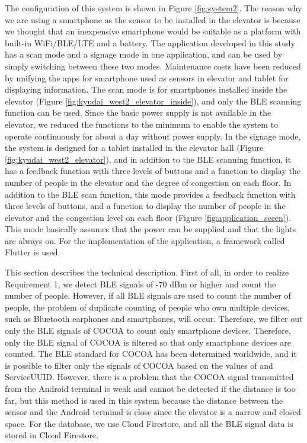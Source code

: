 The configuration of this system is shown in Figure \ref{fig:system2}. The reason why we are using a smartphone as the sensor to be installed in the elevator is because we thought that an inexpensive smartphone would be suitable as a platform with built-in WiFi/BLE/LTE and a battery. The application developed in this study has a scan mode and a signage mode in one application, and can be used by simply switching between these two modes. Maintenance costs have been reduced by unifying the apps for smartphone used as sensors in elevator and tablet for displaying information. The scan mode is for smartphones installed inside the elevator (Figure \ref{fig:kyudai_west2_elevator_inside}), and only the BLE scanning function can be used. Since the basic power supply is not available in the elevator, we reduced the functions to the minimum to enable the system to operate continuously for about a day without power supply. In the signage mode, the system is designed for a tablet installed in the elevator hall (Figure \ref{fig:kyudai_west2_elevator}), and in addition to the BLE scanning function, it has a feedback function with three levels of buttons and a function to display the number of people in the elevator and the degree of congestion on each floor. In addition to the BLE scan function, this mode provides a feedback function with three levels of buttons, and a function to display the number of people in the elevator and the congestion level on each floor (Figure \ref{fig:application_sceen}). This mode basically assumes that the power can be supplied and that the lights are always on. For the implementation of the application, a framework called Flutter is used.

\thispagestyle{kisuu}

This section describes the technical description. First of all, in order to realize Requirement 1, we detect BLE signals of -70 dBm or higher and count the number of people. However, if all BLE signals are used to count the number of people, the problem of duplicate counting of people who own multiple devices, such as Bluetooth earphones and smartphones, will occur. Therefore, we filter out only the BLE signals of COCOA to count only smartphone devices. Therefore, only the BLE signal of COCOA is filtered so that only smartphone devices are counted. The BLE standard for COCOA has been determined worldwide, and it is possible to filter only the signals of COCOA based on the values of \cite{cocoa_ble} and ServiceUUID. However, there is a problem that the COCOA signal transmitted from the Android terminal is weak and cannot be detected if the distance is too far, but this method is used in this system because the distance between the sensor and the Android terminal is close since the elevator is a narrow and closed space. For the database, we use Cloud Firestore, and all the BLE signal data is stored in Cloud Firestore.

